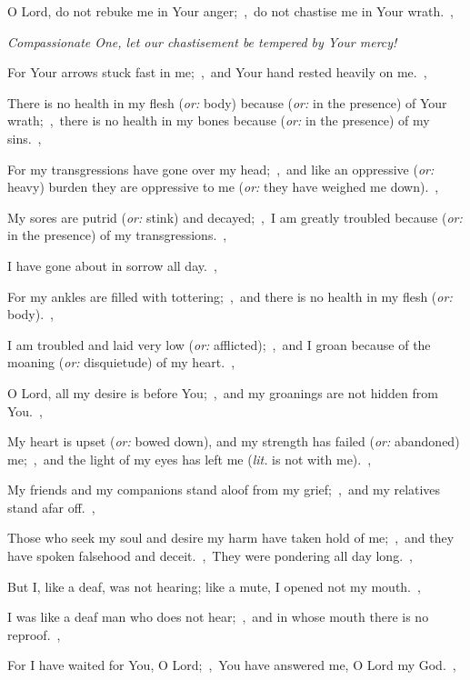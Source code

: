 \documentclass[12pt,twoside,a5paper]{article}
\newcommand{\qanona}[1]{{\liturgicalhint{Qanona.} \emph{#1}}}
\newcommand{\translationoption}[1]{\emph{or:} #1}
\newcommand{\translationliteral}[1]{\emph{lit.} #1}
\begin{document}
\begin{normalparskip}
  O Lord, do not rebuke me in Your anger;~\sep\ do not chastise me in Your wrath.~\sep

  \qanona{Compassionate One, let our chastisement be tempered by Your mercy!}

  For Your arrows stuck fast in me;~\sep\ and Your hand rested heavily on me.~\sep

  There is no health in my flesh (\translationoption{body}) because (\translationoption{in the presence}) of Your wrath;~\sep\ there is no health in my bones because (\translationoption{in the presence}) of my sins.~\sep

  For my transgressions have gone over my head;~\sep\ and like an oppressive (\translationoption{heavy}) burden they are oppressive to me (\translationoption{they have weighed me down}).~\sep

  My sores are putrid (\translationoption{stink}) and decayed;~\sep\ I am greatly troubled because (\translationoption{in the presence}) of my transgressions.~\sep

  I have gone about in sorrow all day.~\sep

  For my ankles are filled with tottering;~\sep\ and there is no health in my flesh (\translationoption{body}).~\sep

  I am troubled and laid very low (\translationoption{afflicted});~\sep\ and I groan because of the moaning (\translationoption{disquietude}) of my heart.~\sep

  O Lord, all my desire is before You;~\sep\ and my groanings are not hidden from You.~\sep

  My heart is upset (\translationoption{bowed down}), and my strength has failed (\translationoption{abandoned}) me;~\sep\ and the light of my eyes has left me (\translationliteral{is not with me}).~\sep

  My friends and my companions stand aloof from my grief;~\sep\ and my relatives stand afar off.~\sep

  Those who seek my soul and desire my harm have taken hold of me;~\sep\ and they have spoken falsehood and deceit.~\sep\ They were pondering all day long.~\sep

  But I, like a deaf, was not hearing; like a mute, I opened not my mouth.~\sep

  I was like a deaf man who does not hear;~\sep\ and in whose mouth there is no reproof.~\sep

  For I have waited for You, O Lord;~\sep\ You have answered me, O Lord my God.~\sep


\end{normalparskip}
\end{document}
